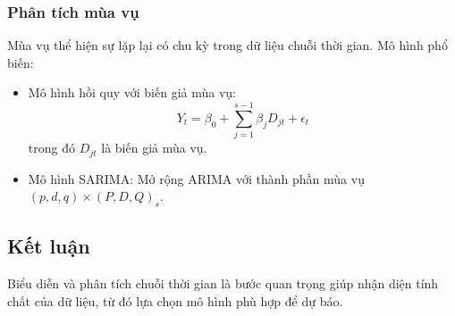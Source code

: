 \subsubsection{Phân tích mùa vụ}
Mùa vụ thể hiện sự lặp lại có chu kỳ trong dữ liệu chuỗi thời gian. Mô hình phổ biến:
\begin{itemize}
    \item Mô hình hồi quy với biến giả mùa vụ:
    \begin{equation}
        Y_t = \beta_0 + \sum_{j=1}^{s-1} \beta_j D_{jt} + \epsilon_t
    \end{equation}
    trong đó $D_{jt}$ là biến giả mùa vụ.
    \item Mô hình SARIMA: Mở rộng ARIMA với thành phần mùa vụ $(p,d,q)\times (P,D,Q)_s$.
\end{itemize}

\subsection{Kết luận}
Biểu diễn và phân tích chuỗi thời gian là bước quan trọng giúp nhận diện tính chất của dữ liệu, từ đó lựa chọn mô hình phù hợp để dự báo.